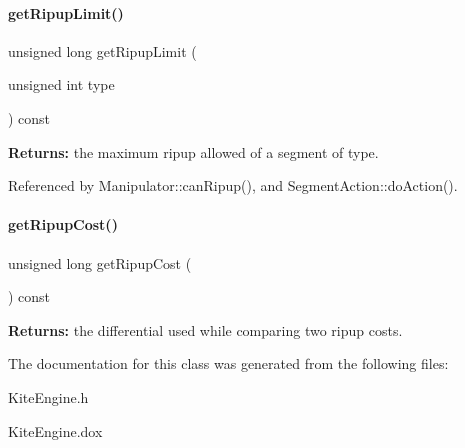 \paragraph{\texorpdfstring{get\+Ripup\+Limit()}{getRipupLimit()}}
{\footnotesize\ttfamily unsigned long get\+Ripup\+Limit (\begin{DoxyParamCaption}\item[{unsigned int}]{type }\end{DoxyParamCaption}) const\hspace{0.3cm}{\ttfamily [inline]}}

{\bfseries Returns\+:} the maximum ripup allowed of a segment of {\ttfamily type}. 

Referenced by Manipulator\+::can\+Ripup(), and Segment\+Action\+::do\+Action().

\mbox{\label{classKite_1_1KiteEngine_a1b4de41d8359251bcfbda288ec6bbbee}} 
\paragraph{\texorpdfstring{get\+Ripup\+Cost()}{getRipupCost()}}
{\footnotesize\ttfamily unsigned long get\+Ripup\+Cost (\begin{DoxyParamCaption}{ }\end{DoxyParamCaption}) const\hspace{0.3cm}{\ttfamily [inline]}}

{\bfseries Returns\+:} the differential used while comparing two ripup costs. 

The documentation for this class was generated from the following files\+:\begin{DoxyCompactItemize}
\item 
Kite\+Engine.\+h\item 
Kite\+Engine.\+dox\end{DoxyCompactItemize}
